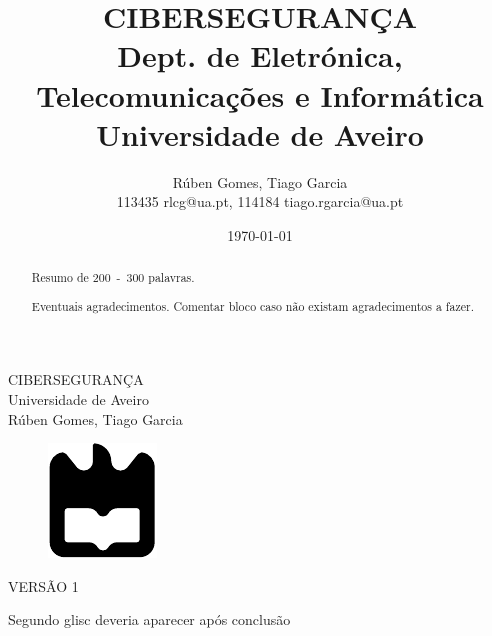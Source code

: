 \documentclass{report}
\begin{document}
%
\def\titulo{CIBERSEGURANÇA}
\def\data{DATA}
\def\autores{Rúben Gomes, Tiago Garcia}
\def\autoresacronimos{RG, TG}
\def\autorescontactos{113435 rlcg@ua.pt, 114184 tiago.rgarcia@ua.pt}
\def\versao{VERSÃO 1}
\def\departamento{Dept. de Eletrónica, Telecomunicações e Informática}
\def\empresa{Universidade de Aveiro}
\def\logotipo{ua.pdf}

%
%
\begin{titlepage}

\begin{center}
%
\vspace*{50mm}
%
{\Huge \titulo}\\ 
%
\vspace{10mm}
%
{\Large \empresa}\\
%
\vspace{10mm}
%
{\LARGE \autores}\\ 
%
\vspace{30mm}
%
\begin{figure}[h]
    \center
    \includegraphics{ua}
\end{figure}
%
\vspace{30mm}
\end{center}
%
\begin{flushright}
\versao
\end{flushright}
\end{titlepage}

\title{%
{\Huge\textbf{\titulo}}\\
{\Large \departamento\\ \empresa}
}
%
\author{%
    \autores \\
    \autorescontactos
}
%
\date{\today}
%
\maketitle


\begin{abstract}
Resumo de 200~-~300 palavras.
\end{abstract}

Segundo glisc deveria aparecer após conclusão
\renewcommand{\abstractname}{Agradecimentos}
\begin{abstract}
Eventuais agradecimentos.
Comentar bloco caso não existam agradecimentos a fazer.
\end{abstract}
\end{document}
